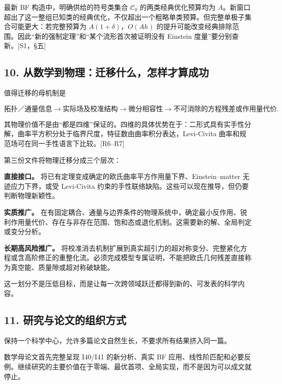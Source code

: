 \documentclass[UTF8,a4paper,11pt,fontset=fandol]{ctexart}
\begin{document}
最新 BF 构造中，明确供给的符号类集合 \(\mathcal C_0\)
的两类经典优化预算均为
\(A\)。新窗口超出了这一整组已知类的经典优化，不仅超出一个粗略单类预算。但完整单极子集合可能更大：若完整预算为
\(A(1+\delta)\)，\(O(Ah)\)
的提升可能改变经典排除范围。因此``新的强制定理''和``某个流形首次被证明没有
Einstein 度量''要分别查新。{[}S1，§五{]}

\subsection{10.
从数学到物理：迁移什么，怎样才算成功}\label{ux4eceux6570ux5b66ux5230ux7269ux7406ux8fc1ux79fbux4ec0ux4e48ux600eux6837ux624dux7b97ux6210ux529f}

值得迁移的母机制是

\[
\text{拓扑／通量信息}
\longrightarrow\text{实际场及校准结构}
\longrightarrow\text{微分相容性}
\longrightarrow\text{不可消除的方程残差或作用量代价}.
\tag{10}
\]

其物理价值不是由``都是四维''保证的。四维的具体优势在于：二形式具有实手性分解，曲率平方积分处于临界尺度，特征数由曲率积分表达，Levi-Civita
曲率和规范场可在同一手性语言下比较。{[}R6--R7{]}

第三份文件将物理迁移分成三个层次：

\textbf{直接接口。}
将已有定理变成确定的欧氏曲率平方作用量下界、Einstein--matter
无迹应力下界，或受 Levi-Civita
约束的手性联络缺陷。这些可以现在推导，但仍要判断物理新颖性。

\textbf{实质推广。}
在有固定耦合、通量与边界条件的物理系统中，确定最小反作用、锐利作用量代价、存在与非存在范围、饱和态或退化机制。这需要新的解、全局判定或变分分析。

\textbf{长期高风险推广。}
将校准消去机制扩展到真实超引力的超对称变分、完整紧化方程或含高阶修正的重整化流。必须完成模型专属证明，不能把欧氏几何残差直接称为真空能、质量隙或超对称破缺能。

这一划分不是压低目标，而是让每一次跨领域跃迁都得到新的、可发表的科学内容。

\subsection{11.
研究与论文的组织方式}\label{ux7814ux7a76ux4e0eux8bbaux6587ux7684ux7ec4ux7ec7ux65b9ux5f0f}

保持一个科学中心，允许多篇论文自然生长，不要求所有结果挤入同一篇。

数学母论文首先完整呈现 I40/I41 的新分析、真实 BF
应用、线性阶匹配和必要反例。继续研究的主要价值在于零端、最优首项、全局实现，而不是因为可以成文就停止。
\end{document}
